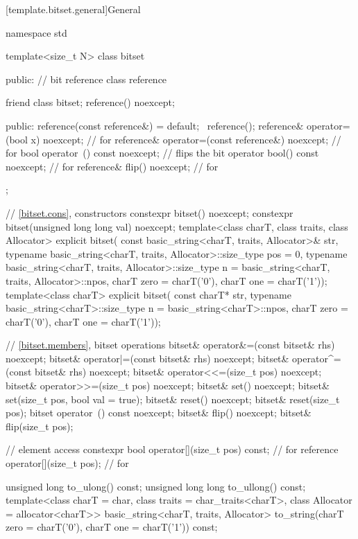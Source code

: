 [template.bitset.general]{General}%
%
\begin{codeblock}
namespace std {
  template<size_t N> class bitset {
  public:
    // bit reference
    class reference {
      friend class bitset;
      reference() noexcept;

    public:
      reference(const reference&) = default;
      ~reference();
      reference& operator=(bool x) noexcept;            // for 
      reference& operator=(const reference&) noexcept;  // for 
      bool operator~() const noexcept;                  // flips the bit
      operator bool() const noexcept;                   // for 
      reference& flip() noexcept;                       // for 
    };

    // \ref{bitset.cons}, constructors
    constexpr bitset() noexcept;
    constexpr bitset(unsigned long long val) noexcept;
    template<class charT, class traits, class Allocator>
      explicit bitset(
        const basic_string<charT, traits, Allocator>& str,
        typename basic_string<charT, traits, Allocator>::size_type pos = 0,
        typename basic_string<charT, traits, Allocator>::size_type n
          = basic_string<charT, traits, Allocator>::npos,
        charT zero = charT('0'),
        charT one = charT('1'));
    template<class charT>
      explicit bitset(
        const charT* str,
        typename basic_string<charT>::size_type n = basic_string<charT>::npos,
        charT zero = charT('0'),
        charT one = charT('1'));

    // \ref{bitset.members}, bitset operations
    bitset& operator&=(const bitset& rhs) noexcept;
    bitset& operator|=(const bitset& rhs) noexcept;
    bitset& operator^=(const bitset& rhs) noexcept;
    bitset& operator<<=(size_t pos) noexcept;
    bitset& operator>>=(size_t pos) noexcept;
    bitset& set() noexcept;
    bitset& set(size_t pos, bool val = true);
    bitset& reset() noexcept;
    bitset& reset(size_t pos);
    bitset  operator~() const noexcept;
    bitset& flip() noexcept;
    bitset& flip(size_t pos);

    // element access
    constexpr bool operator[](size_t pos) const;        // for 
    reference operator[](size_t pos);                   // for 

    unsigned long to_ulong() const;
    unsigned long long to_ullong() const;
    template<class charT = char,
             class traits = char_traits<charT>,
             class Allocator = allocator<charT>>
      basic_string<charT, traits, Allocator>
        to_string(charT zero = charT('0'), charT one = charT('1')) const;

}}
\end{codeblock}
